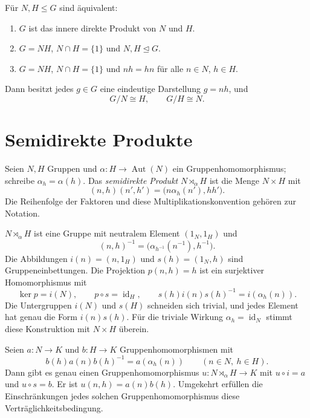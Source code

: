 \begin{theorem}
\label{b40guide:thm:internal-direct}
Für $N,H\leq G$ sind äquivalent:
\begin{enumerate}
\item $G$ ist das innere direkte Produkt von $N$ und $H$.
\item $G=NH$, $N\cap H=\{1\}$ und $N,H\trianglelefteq G$.
\item $G=NH$, $N\cap H=\{1\}$ und $nh=hn$ für alle $n\in N$, $h\in H$.
\end{enumerate}
Dann besitzt jedes $g\in G$ eine eindeutige Darstellung $g=nh$, und
\[
 G/N\cong H,\qquad G/H\cong N.
\]
\cite{milne}
\end{theorem}

\section{Semidirekte Produkte}

\begin{definition}
\label{b40guide:def:semidirect}
Seien $N,H$ Gruppen und $\alpha:H\to\operatorname{Aut}(N)$
ein Gruppenhomomorphismus; schreibe $\alpha_h=\alpha(h)$.
Das \emph{semidirekte Produkt} $N\rtimes_\alpha H$ ist die Menge
$N\times H$ mit
\[
 (n,h)(n',h')=\bigl(n\alpha_h(n'),hh'\bigr).
\]
Die Reihenfolge der Faktoren und diese Multiplikationskonvention
gehören zur Notation.
\end{definition}

\begin{theorem}
\label{b40guide:thm:semidirect-structure}
$N\rtimes_\alpha H$ ist eine Gruppe mit neutralem Element $(1_N,1_H)$
und
\[
 (n,h)^{-1}=\bigl(\alpha_{h^{-1}}(n^{-1}),h^{-1}\bigr).
\]
Die Abbildungen $i(n)=(n,1_H)$ und $s(h)=(1_N,h)$ sind
Gruppeneinbettungen. Die Projektion $p(n,h)=h$ ist ein surjektiver
Homomorphismus mit
\[
 \ker p=i(N),\qquad p\circ s=\operatorname{id}_H,
 \qquad s(h)i(n)s(h)^{-1}=i(\alpha_h(n)).
\]
Die Untergruppen $i(N)$ und $s(H)$ schneiden sich trivial, und jedes
Element hat genau die Form $i(n)s(h)$.
Für die triviale Wirkung $\alpha_h=\operatorname{id}_N$ stimmt diese
Konstruktion mit $N\times H$ überein.
\cite{milne}
\end{theorem}

\begin{theorem}
\label{b40guide:thm:semidirect-universal}
Seien $a:N\to K$ und $b:H\to K$ Gruppenhomomorphismen mit
\[
 b(h)a(n)b(h)^{-1}=a(\alpha_h(n))
 \qquad(n\in N,\ h\in H).
\]
Dann gibt es genau einen Gruppenhomomorphismus
$u:N\rtimes_\alpha H\to K$ mit $u\circ i=a$ und $u\circ s=b$.
Er ist $u(n,h)=a(n)b(h)$.
Umgekehrt erfüllen die Einschränkungen jedes solchen
Gruppenhomomorphismus diese Verträglichkeitsbedingung.
\cite{milne}
\end{theorem}

